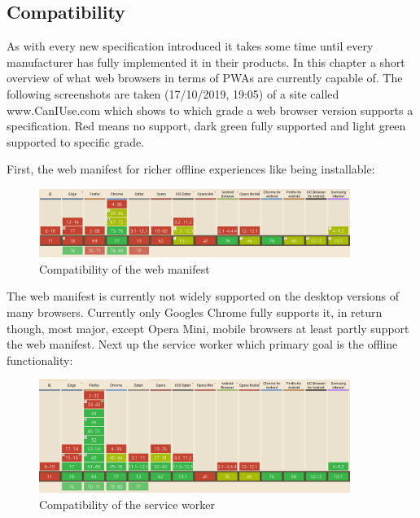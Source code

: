 \subsection{Compatibility}
\label{sec:theorieCc}


As with every new specification introduced it takes some time until every manufacturer has fully implemented it in their products. In this chapter a short overview of what web browsers in terms of PWAs are currently capable of. The following screenshots are taken (17/10/2019, 19:05) of a site called www.CanIUse.com which shows to which grade a web browser version supports a  specification. Red means no support, dark green fully supported and light green supported to specific grade.

First, the web manifest for richer offline experiences like being installable:

\begin{figure}[htbp] 
	\centering
	\includegraphics[width=0.9\textwidth]{Assets/chapter_pwa/webmanifestsupport.PNG}
	\caption{Compatibility of the web manifest}
	\label{fig:pwa_comptaibility_webmanifest}
\end{figure}


The web manifest is currently not widely supported on the desktop versions of many browsers. Currently only Googles Chrome fully supports it, in return though, most major, except Opera Mini, mobile browsers at least partly support the web manifest. 
\newline
Next up the service worker which primary goal is the offline functionality:

\begin{figure}[htbp] 
	\centering
	\includegraphics[width=0.9\textwidth]{Assets/chapter_pwa/serviceworkersupport.PNG}
	\caption{Compatibility of the service worker}
	\label{fig:pwa_comptaibility_serviceworker}
\end{figure}

